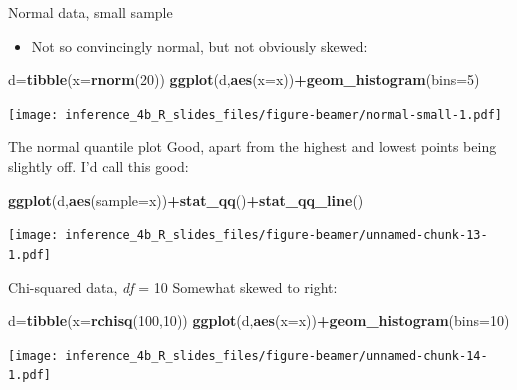 \documentclass[
  ignorenonframetext,
]{beamer}
\newenvironment{Shaded}{\begin{snugshade}}{\end{snugshade}}
\newcommand{\DataTypeTok}[1]{\textcolor[rgb]{0.13,0.29,0.53}{#1}}
\newcommand{\DecValTok}[1]{\textcolor[rgb]{0.00,0.00,0.81}{#1}}
\newcommand{\KeywordTok}[1]{\textcolor[rgb]{0.13,0.29,0.53}{\textbf{#1}}}
\newcommand{\NormalTok}[1]{#1}
\newcommand{\OperatorTok}[1]{\textcolor[rgb]{0.81,0.36,0.00}{\textbf{#1}}}
\providecommand{\tightlist}{%
  \setlength{\itemsep}{0pt}\setlength{\parskip}{0pt}}
\begin{document}
\begin{frame}[fragile]{Normal data, small sample}
\protect\hypertarget{normal-data-small-sample}{}
\begin{itemize}
\tightlist
\item
  Not so convincingly normal, but not obviously skewed:
\end{itemize}

\begin{Shaded}
\begin{Highlighting}[]
\NormalTok{d=}\KeywordTok{tibble}\NormalTok{(}\DataTypeTok{x=}\KeywordTok{rnorm}\NormalTok{(}\DecValTok{20}\NormalTok{))}
\KeywordTok{ggplot}\NormalTok{(d,}\KeywordTok{aes}\NormalTok{(}\DataTypeTok{x=}\NormalTok{x))}\OperatorTok{+}\KeywordTok{geom\_histogram}\NormalTok{(}\DataTypeTok{bins=}\DecValTok{5}\NormalTok{)}
\end{Highlighting}
\end{Shaded}

\texttt{[image: inference\_4b\_R\_slides\_files/figure-beamer/normal-small-1.pdf]}
\end{frame}

\begin{frame}[fragile]{The normal quantile plot}
\protect\hypertarget{the-normal-quantile-plot-2}{}
Good, apart from the highest and lowest points being slightly off. I'd
call this good:

\begin{Shaded}
\begin{Highlighting}[]
\KeywordTok{ggplot}\NormalTok{(d,}\KeywordTok{aes}\NormalTok{(}\DataTypeTok{sample=}\NormalTok{x))}\OperatorTok{+}\KeywordTok{stat\_qq}\NormalTok{()}\OperatorTok{+}\KeywordTok{stat\_qq\_line}\NormalTok{()}
\end{Highlighting}
\end{Shaded}

\texttt{[image: inference\_4b\_R\_slides\_files/figure-beamer/unnamed-chunk-13-1.pdf]}
\end{frame}

\begin{frame}[fragile]{Chi-squared data, \emph{df} = 10}
\protect\hypertarget{chi-squared-data-df-10}{}
Somewhat skewed to right:

\begin{Shaded}
\begin{Highlighting}[]
\NormalTok{d=}\KeywordTok{tibble}\NormalTok{(}\DataTypeTok{x=}\KeywordTok{rchisq}\NormalTok{(}\DecValTok{100}\NormalTok{,}\DecValTok{10}\NormalTok{))}
\KeywordTok{ggplot}\NormalTok{(d,}\KeywordTok{aes}\NormalTok{(}\DataTypeTok{x=}\NormalTok{x))}\OperatorTok{+}\KeywordTok{geom\_histogram}\NormalTok{(}\DataTypeTok{bins=}\DecValTok{10}\NormalTok{)}
\end{Highlighting}
\end{Shaded}

\texttt{[image: inference\_4b\_R\_slides\_files/figure-beamer/unnamed-chunk-14-1.pdf]}
\end{frame}
\end{document}

